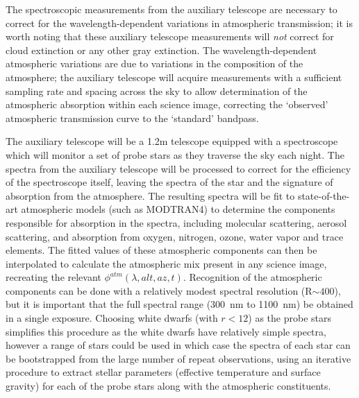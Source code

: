 \documentclass[12pt,preprint]{aastex}
\begin{document}
The spectroscopic measurements from the auxiliary telescope are
necessary to correct for the wavelength-dependent variations in
atmospheric transmission; it is worth noting that these auxiliary
telescope measurements will {\it not} correct for cloud extinction or
any other gray extinction. The wavelength-dependent atmospheric
variations are due to variations in the composition of the atmosphere;
the auxiliary telescope will acquire measurements with a sufficient
sampling rate and spacing across the sky to allow determination of the
atmospheric absorption within each science image, correcting the
`observed' atmospheric transmission curve to the `standard' bandpass.

The auxiliary telescope will be a 1.2m telescope equipped with a
spectroscope which will monitor a set of probe stars as they traverse
the sky each night. The spectra from the auxiliary telescope will be
processed to correct for the efficiency of the spectroscope itself,
leaving the spectra of the star and the signature of absorption from
the atmosphere. The resulting spectra will be fit to state-of-the-art
atmospheric models (such as MODTRAN4) to determine the 
components responsible for absorption in the spectra, including
molecular scattering, aerosol scattering, and absorption from oxygen, nitrogen, ozone,
water vapor and trace elements. The fitted values of these atmospheric components
can then be interpolated to calculate the atmospheric mix present in
any science image, recreating the relevant
$\phi^{atm}(\lambda,alt,az,t)$. Recognition of the atmospheric components
can be done with a relatively modest spectral resolution (R$\sim400$),
but it is important that the full spectral range (300~nm to 1100~nm)
be obtained in a single exposure. Choosing white dwarfs (with $r<12$)
as the probe stars simplifies this procedure as the white dwarfs have
relatively simple spectra, however a range of stars could be used in
which case the spectra of each star can be bootstrapped from the large
number of repeat observations, using an iterative procedure to extract
stellar parameters (effective temperature and surface gravity) for
each of the probe stars along with the atmospheric constituents. 
\end{document}

